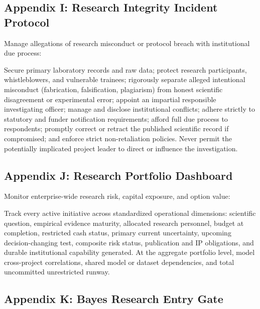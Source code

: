\subsection{Appendix I: Research Integrity Incident Protocol}

Manage allegations of research misconduct or protocol breach with institutional due process:

\begin{tcolorbox}[colback=BayesCanvas,colframe=BayesDark,arc=1mm,title=\textbf{Appendix I: Research Integrity Incident Protocol}]
\scriptsize
Secure primary laboratory records and raw data; protect research participants, whistleblowers, and vulnerable trainees; rigorously separate alleged intentional misconduct (fabrication, falsification, plagiarism) from honest scientific disagreement or experimental error; appoint an impartial responsible investigating officer; manage and disclose institutional conflicts; adhere strictly to statutory and funder notification requirements; afford full due process to respondents; promptly correct or retract the published scientific record if compromised; and enforce strict non-retaliation policies. Never permit the potentially implicated project leader to direct or influence the investigation.
\end{tcolorbox}

\subsection{Appendix J: Research Portfolio Dashboard}

Monitor enterprise-wide research risk, capital exposure, and option value:

\begin{tcolorbox}[colback=BayesCanvas,colframe=BayesDark,arc=1mm,title=\textbf{Appendix J: Research Portfolio Dashboard Dimensions}]
\scriptsize
Track every active initiative across standardized operational dimensions: scientific question, empirical evidence maturity, allocated research personnel, budget at completion, restricted cash status, primary current uncertainty, upcoming decision-changing test, composite risk status, publication and IP obligations, and durable institutional capability generated. At the aggregate portfolio level, model cross-project correlations, shared model or dataset dependencies, and total uncommitted unrestricted runway.
\end{tcolorbox}

\subsection{Appendix K: Bayes Research Entry Gate}

